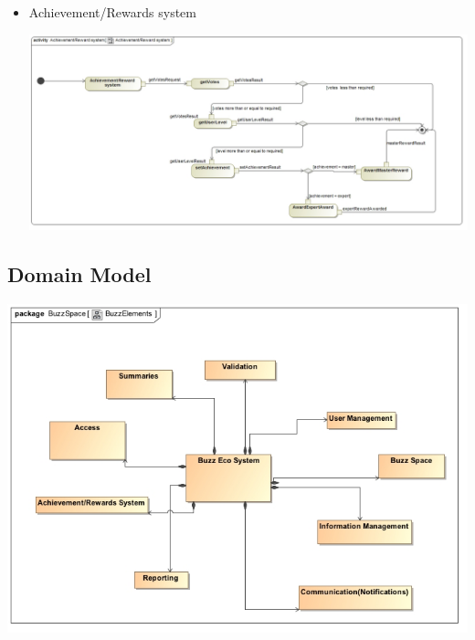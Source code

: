 \documentclass[a4paper,12pt]{report}
\begin{document}
\begin{itemize}
\begin{center}
		\end{center}
	\item Achievement/Rewards system
		\begin{center}
		\includegraphics[width=1\textwidth]
		 {../Goodness/Achievement_Rewards_System_ActivityDiagram.jpg}\\[0.4cm]
		\end{center}
\end{itemize}
\subsection{Domain Model}
	\begin{center}
  	 	\includegraphics[width=1\textwidth] {../Hanrich/BuzzElements.jpg}\\[0.4cm]    
	\end{center}
\newpage


{} 

\end{document}
